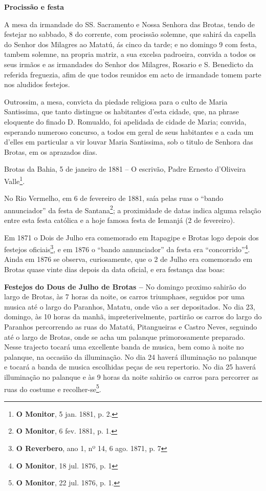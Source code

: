 \begin{citacao}
\textbf{Procissão e festa}

A mesa da irmandade do SS. Sacramento e Nossa Senhora das Brotas, tendo de festejar no sabbado, 8 do corrente, com procissão solemne, que sahirá da capella do Senhor dos Milagres ao Matatú, ás cinco da tarde; e no domingo 9 com festa, tambem solemne, na propria matriz, a sua excelsa padroeira, convida a todos os seus irmãos e as irmandades do Senhor dos Milagres, Rosario e S. Benedicto da referida freguezia, afim de que todos reunidos em acto de irmandade tomem parte nos aludidos festejos.

Outrossim, a mesa, convicta da piedade religiosa para o culto de Maria Santissima, que tanto distingue os habitantes d'esta cidade, que, na phrase eloquente do finado D. Romualdo, foi apelidada de cidade de Maria; convida, esperando numeroso concurso, a todos em geral de seus habitantes e a cada um d'elles em particular a vir louvar Maria Santissima, sob o titulo de Senhora das Brotas, em os aprazados dias.

Brotas da Bahia, 5 de janeiro de 1881 -- O escrivão, Padre Ernesto d'Oliveira Valle\footnote{\textbf{O Monitor}, 5 jan. 1881, p. 2.}.
\end{citacao}

No Rio Vermelho, em 6 de fevereiro de 1881, saía pelas ruas o ``bando annunciador'' da festa de Santana\footnote{\textbf{O Monitor}, 6 fev. 1881, p. 1.}; a proximidade de datas indica alguma relação entre esta festa católica e a hoje famosa festa de Iemanjá (2 de fevereiro).

Em 1871 o Dois de Julho era comemorado em Itapagipe e Brotas logo depois dos festejos oficiais\footnote{\textbf{O Reverbero}, ano 1, nº 14, 6 ago. 1871, p. 7}, e em 1876 o ``bando annunciador'' da festa era ``concorrido''\footnote{\textbf{O Monitor}, 18 jul. 1876, p. 1}. Ainda em 1876 se observa, curiosamente, que o 2 de Julho era comemorado em Brotas quase vinte dias depois da data oficial, e era festança das boas:

\begin{citacao}
\textbf{Festejos do Dous de Julho de Brotas --} No domingo proximo sahirão do largo de Brotas, às 7 horas da noite, os carros triumphaes, seguidos por uma musica até o largo do Paranhos, Matatu, onde vão a ser depositados.
No dia 23, domingo, às 10 horas da manhã, impreterivelmente, partirão os carros do largo do Paranhos percorrendo as ruas do Matatú, Pitangueiras e Castro Neves, seguindo até o largo de Brotas, onde se acha um palanque primorosamente preparado.
Nesse trajecto tocará uma excellente banda de musica, bem como à noite no palanque, na occasião da illuminação.
No dia 24 haverá illuminação no palanque e tocará a banda de musica escolhidas peças de seu repertorio.
No dia 25 haverá illuminação no palanque e às 9 horas da noite sahirão os carros para percorrer as ruas do costume e recolher-se\footnote{\textbf{O Monitor}, 22 jul. 1876, p. 1.}.
\end{citacao}

